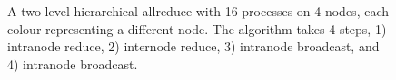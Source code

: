 \begin{figure}
\begin{tikzpicture}
    \end{tikzpicture}
    \caption[Sixteen-Process Four-Node Hierarchical Allreduce]{
        A two-level hierarchical allreduce with 16 processes on 4 nodes, each colour representing a different node.
        The algorithm takes 4 steps, 1) intranode reduce, 2) internode reduce, 3) intranode broadcast, and 4) intranode broadcast.
    }
    \label{fig:sample_heir_allreduce}
\end{figure}